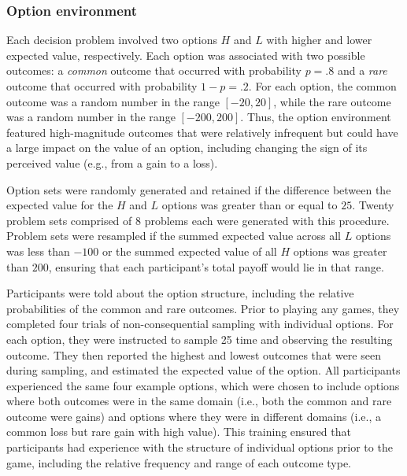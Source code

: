 \documentclass[11pt,jou]{apa6}
\begin{document}
\subsubsection{Option environment}

Each decision problem involved two options $H$ and $L$ with higher and lower expected value, respectively.
Each option was associated with two possible outcomes: a \emph{common} outcome that occurred with probability $p = .8$ and a \emph{rare} outcome that occurred with probability $1 - p = .2$.
For each option, the common outcome was a random number in the range $[-20, 20]$, while the rare outcome was a random number in the range $[-200, 200]$.
Thus, the option environment featured high-magnitude outcomes that were relatively infrequent but could have a large impact on the value of an option, including changing the sign of its perceived value (e.g., from a gain to a loss).

Option sets were randomly generated and retained if the difference between the expected value for the $H$ and $L$ options was greater than or equal to $25$. 
Twenty problem sets comprised of 8 problems each were generated with this procedure.
Problem sets were resampled if the summed expected value across all $L$ options was less than $-100$ or the summed expected value of all $H$ options was greater than $200$, ensuring that each participant's total payoff would lie in that range.

Participants were told about the option structure, including the relative probabilities of the common and rare outcomes.
Prior to playing any games, they completed four trials of non-consequential sampling with individual options.
For each option, they were instructed to sample 25 time and observing the resulting outcome.
They then reported the highest and lowest outcomes that were seen during sampling, and estimated the expected value of the option.
All participants experienced the same four example options, which were chosen to include options where both outcomes were in the same domain (i.e., both the common and rare outcome were gains) and options where they were in different domains (i.e., a common loss but rare gain with high value).
This training ensured that participants had experience with the structure of individual options prior to the game, including the relative frequency and range of each outcome type. 
\end{document}
